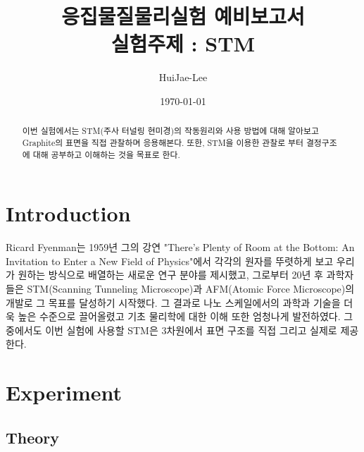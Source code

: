 \documentclass[aps,reprint,superscriptaddress]{revtex4-2}
\begin{document}
\title{응집물질물리실험 예비보고서 \\
\small 실험주제 : STM}

\author{HuiJae-Lee}
\date{\today}


\begin{abstract}
 이번 실험에서는 STM(주사 터널링 현미경)의 작동원리와 사용 방법에 대해 알아보고 
 Graphite의 표면을 직접 관찰하며 응용해본다. 또한, STM을 이용한 관찰로 부터 결정구조에 대해
 공부하고 이해하는 것을 목표로 한다.
\end{abstract}

\maketitle

\section[Introduction]{Introduction}
Ricard Fyenman는 1959년 그의 강연 
"There's Plenty of Room at the Bottom: 
An Invitation to Enter a New Field of Physics"에서 각각의 
원자를 뚜렷하게 보고 우리가 원하는 방식으로 배열하는 새로운 연구 분야를 
제시했고, 그로부터 20년 후 과학자들은 STM(Scanning Tunneling Microscope)과 
AFM(Atomic Force Microscope)의 개발로 그 목표를 달성하기 시작했다. 그 결과로
나노 스케일에서의 과학과 기술을 더욱 높은 수준으로 끌어올렸고 기초 물리학에 대한 이해 또한
엄청나게 발전하였다. 그 중에서도 이번 실험에 사용할 STM은 3차원에서 표면 구조를 직접 그리고
실제로 제공한다.
\section[Experiment]{Experiment}
\subsection{Theory}
\end{document}
